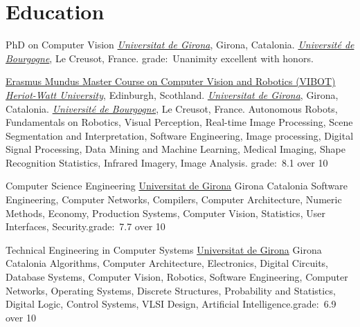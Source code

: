 \section{Education}

{PhD on Computer Vision}
{}
{}
{}
{\href{http://www.udg.edu}{\emph{Universitat de Girona}}, Girona, Catalonia.
  \newline\href{http://www.u-bourgogne.fr}{\emph{Universit\'{e} de Bourgogne}}, Le Creusot, France.
  \newline grade:~Unanimity excellent with honors.
}

{\href{http://www.vibot.org}{Erasmus Mundus Master Course on Computer Vision and Robotics (VIBOT)}}
{}
{}
{}
{\href{http://www.hw.ac.uk}{\emph{Heriot-Watt University}}, Edinburgh, Scothland.
  \newline\href{http://www.udg.edu}{\emph{Universitat de Girona}}, Girona, Catalonia.
  \newline\href{http://www.u-bourgogne.fr}{\emph{Universit\'{e} de Bourgogne}}, Le Creusot, France.
  \newline
Autonomous Robots, Fundamentals on Robotics, Visual Perception, Real-time Image Processing, Scene Segmentation and Interpretation, Software Engineering, Image processing, Digital Signal Processing, Data Mining and Machine Learning, Medical Imaging, Shape Recognition Statistics, Infrared Imagery, Image Analysis.
  \newline grade:~8.1 over 10
}

                {Computer Science Engineering}
                {\newline\href{http://www.udg.edu}{Universitat de Girona}}
                {Girona}
                {Catalonia}
                {Software Engineering, Computer Networks, Compilers, Computer Architecture, Numeric Methods, Economy, Production Systems, Computer Vision, Statistics, User Interfaces, Security.\newline grade:~7.7 over 10
                }

                {Technical Engineering in Computer Systems}
                {\newline\href{http://www.udg.edu}{Universitat de Girona}}
                {Girona}
                {Catalonia}
                {Algorithms, Computer Architecture, Electronics, Digital Circuits, Database Systems, Computer Vision, Robotics, Software Engineering, Computer Networks, Operating Systems, Discrete Structures, Probability and Statistics, Digital Logic, Control Systems, VLSI Design, Artificial Intelligence.\newline grade:~6.9 over 10}

